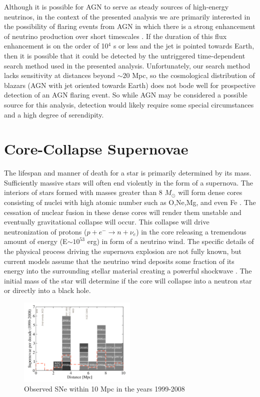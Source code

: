 \documentclass{gatech-thesis}
\begin{document}
Although it is possible for AGN to serve as steady sources of high-energy neutrinos, in the context of the presented analysis we are primarily interested in the possibility of flaring events from AGN in which there is a strong enhancement of neutrino production over short timescales \cite{1997ARA&A..35..445U}. If the duration of this flux enhancement is on the order of 10$^4$ s or less and the jet is pointed towards Earth, then it is possible that it could be detected by the untriggered time-dependent search method used in the presented analysis. Unfortunately, our search method lacks sensitivity at distances beyond $\sim 20$ Mpc, so the cosmological distribution of blazars (AGN with jet oriented towards Earth) does not bode well for prospective detection of an AGN flaring event. So while AGN may be considered a possible source for this analysis, detection would likely require some special circumstances and a high degree of serendipity.

\section{Core-Collapse Supernovae}
The lifespan and manner of death for a star is primarily determined by its mass. Sufficiently massive stars will often end violently in the form of a supernova. The interiors of stars formed with masses greater than 8 $M_{\odot}$ will form dense cores consisting of nuclei with high atomic number such as O,Ne,Mg, and even Fe \cite{2003astro.ph..1006H}. The cessation of nuclear fusion in these dense cores will render them unstable and eventually gravitational collapse will occur. This collapse will drive neutronization of protons ($p+e^{-} \rightarrow n + \nu_e$) in the core releasing a tremendous amount of energy (E$\sim 10^{53}$ erg) in form of a neutrino wind. The specific details of the physical process driving the supernova explosion are not fully known, but current models assume that the neutrino wind deposits some fraction of its energy into the surrounding stellar material creating a powerful shockwave \cite{2003astro.ph..1006H}. The initial mass of the star will determine if the core will collapse into a neutron star or directly into a black hole.

\begin{figure}[ht]
  \begin{center}
    \includegraphics[width=0.5\textwidth,keepaspectratio]{NearbySNCatalogue.png}
  \end{center}
  \caption[Local SNe within 10 Mpc]{Observed SNe within 10 Mpc in the years 1999-2008 \cite{2011PhRvD..83l3008K}}
  \label{fig:local_ccsne}
\end{figure}
\end{document}
